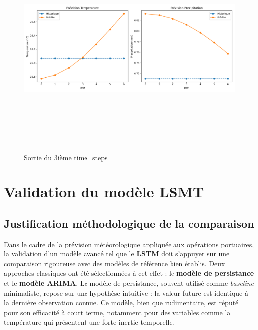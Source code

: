 \documentclass[a4paper,12pt,openany]{report}
\begin{document}
\begin{figure}[H]
\begin{center}
\begin{center}
		\end{center}

		
	
	\end{center}
\end{figure}%


\begin{figure}[H]
\begin{center}
		 \begin{minipage}{\textwidth}
		    \begin{center}
		    \includegraphics[width=1\textwidth,height=4.3in]{images/time_steps20_vraiF.png}
		    \end{center}
		    \end{minipage}

	
	\caption{Sortie du 3ième time\_steps\label{Fig 3.4}}
\end{center}
\end{figure}%


	




\section{Validation du modèle LSMT  }
		\subsection{Justification méthodologique de la comparaison}
	
	\quad
	Dans le cadre de la prévision météorologique appliquée aux opérations portuaires, la validation d’un modèle avancé tel que le \textbf{LSTM} doit s’appuyer sur une comparaison rigoureuse avec des modèles de référence bien établis. Deux approches classiques ont été sélectionnées à cet effet : le \textbf{modèle de persistance} et le \textbf{modèle ARIMA}. Le modèle de persistance, souvent utilisé comme \textit{baseline} minimaliste, repose sur une hypothèse intuitive : la valeur future est identique à la dernière observation connue. Ce modèle, bien que rudimentaire, est réputé pour son efficacité à court terme, notamment pour des variables comme la température qui présentent une forte inertie temporelle.
	
\end{document}
